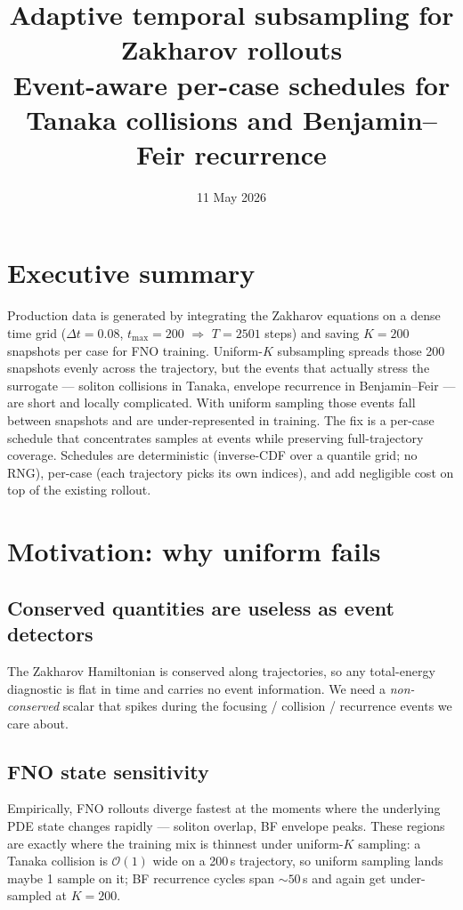 \documentclass[11pt]{article}
\title{Adaptive temporal subsampling for Zakharov rollouts\\
\large Event-aware per-case schedules for Tanaka collisions and Benjamin--Feir recurrence}
\author{}
\date{11 May 2026}
\begin{document}
\maketitle

\section*{Executive summary}

Production data is generated by integrating the Zakharov equations on a dense
time grid ($\Delta t = 0.08$, $t_{\max} = 200$ $\Rightarrow$ $T = 2501$ steps) and
saving $K = 200$ snapshots per case for FNO training. Uniform-$K$ subsampling
spreads those 200 snapshots evenly across the trajectory, but the events that
actually stress the surrogate --- soliton collisions in Tanaka, envelope
recurrence in Benjamin--Feir --- are short and locally complicated. With uniform
sampling those events fall between snapshots and are under-represented in
training. The fix is a per-case schedule that concentrates samples at events
while preserving full-trajectory coverage. Schedules are deterministic
(inverse-CDF over a quantile grid; no RNG), per-case (each trajectory picks its
own indices), and add negligible cost on top of the existing rollout.

\section{Motivation: why uniform fails}

\subsection{Conserved quantities are useless as event detectors}

The Zakharov Hamiltonian is conserved along trajectories, so any total-energy
diagnostic is flat in time and carries no event information. We need a
\emph{non-conserved} scalar that spikes during the focusing / collision /
recurrence events we care about.

\subsection{FNO state sensitivity}

Empirically, FNO rollouts diverge fastest at the moments where the underlying
PDE state changes rapidly --- soliton overlap, BF envelope peaks. These regions
are exactly where the training mix is thinnest under uniform-$K$ sampling: a
Tanaka collision is $\mathcal{O}(1)$ wide on a 200\,s trajectory, so uniform
sampling lands maybe 1 sample on it; BF recurrence cycles span $\sim 50$\,s and
again get under-sampled at $K = 200$.
\end{document}
